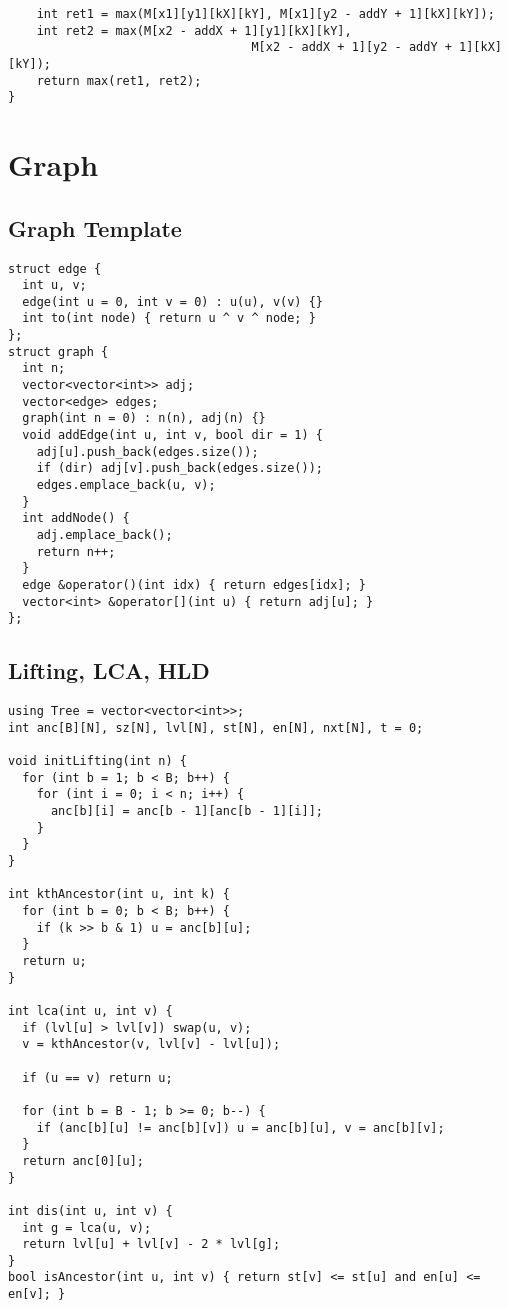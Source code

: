 \documentclass[FSZ,a4paper,onesided]{article}
\begin{document}
\begin{multicols*}{\COLS}
\begin{lstlisting}
    int ret1 = max(M[x1][y1][kX][kY], M[x1][y2 - addY + 1][kX][kY]);
    int ret2 = max(M[x2 - addX + 1][y1][kX][kY],
                                  M[x2 - addX + 1][y2 - addY + 1][kX][kY]);
    return max(ret1, ret2);
}
\end{lstlisting}
\section{Graph}
\subsection{Graph Template}
\begin{lstlisting}
struct edge {
  int u, v;
  edge(int u = 0, int v = 0) : u(u), v(v) {}
  int to(int node) { return u ^ v ^ node; }
};
struct graph {
  int n;
  vector<vector<int>> adj;
  vector<edge> edges;
  graph(int n = 0) : n(n), adj(n) {}
  void addEdge(int u, int v, bool dir = 1) {
    adj[u].push_back(edges.size());
    if (dir) adj[v].push_back(edges.size());
    edges.emplace_back(u, v);
  }
  int addNode() {
    adj.emplace_back();
    return n++;
  }
  edge &operator()(int idx) { return edges[idx]; }
  vector<int> &operator[](int u) { return adj[u]; }
};
\end{lstlisting}
\subsection{Lifting, LCA, HLD}
\begin{lstlisting}
using Tree = vector<vector<int>>;
int anc[B][N], sz[N], lvl[N], st[N], en[N], nxt[N], t = 0;

void initLifting(int n) {
  for (int b = 1; b < B; b++) {
    for (int i = 0; i < n; i++) {
      anc[b][i] = anc[b - 1][anc[b - 1][i]];
    }
  }
}

int kthAncestor(int u, int k) {
  for (int b = 0; b < B; b++) {
    if (k >> b & 1) u = anc[b][u];
  }
  return u;
}

int lca(int u, int v) {
  if (lvl[u] > lvl[v]) swap(u, v);
  v = kthAncestor(v, lvl[v] - lvl[u]);

  if (u == v) return u;

  for (int b = B - 1; b >= 0; b--) {
    if (anc[b][u] != anc[b][v]) u = anc[b][u], v = anc[b][v];
  }
  return anc[0][u];
}

int dis(int u, int v) {
  int g = lca(u, v);
  return lvl[u] + lvl[v] - 2 * lvl[g];
}
bool isAncestor(int u, int v) { return st[v] <= st[u] and en[u] <= en[v]; }


\end{lstlisting}
\end{multicols*}
\end{document}
